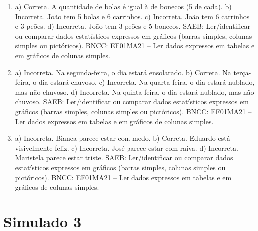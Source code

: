 \begin{enumerate}
\item
a) Correta. A quantidade de bolas é igual à de bonecos (5 de cada).
b) Incorreta. João tem 5 bolas e 6 carrinhos.
c) Incorreta. João tem 6 carrinhos e 3 peões.
d) Incorreta. João tem 3 peões e 5 bonecos.
SAEB: Ler/identificar ou comparar dados estatísticos expressos
em gráficos (barras simples, colunas simples ou pictóricos).
BNCC: EF01MA21 -- Ler dados expressos em tabelas e em gráficos de colunas
simples.

\item
a) Incorreta. Na segunda-feira, o dia estará ensolarado.
b) Correta. Na terça-feira, o dia estará chuvoso.
c) Incorreta. Na quarta-feira, o dia estará nublado, mas não chuvoso.
d) Incorreta. Na quinta-feira, o dia estará nublado, mas não chuvoso.
SAEB: Ler/identificar ou comparar dados estatísticos expressos
em gráficos (barras simples, colunas simples ou pictóricos).
BNCC: EF01MA21  -- Ler dados expressos em tabelas e em gráficos de colunas
simples.

\item
a) Incorreta. Bianca parece estar com medo.
b) Correta. Eduardo está visivelmente feliz.
c) Incorreta. José parece estar com raiva.
d) Incorreta. Maristela parece estar triste.
SAEB: Ler/identificar ou comparar dados estatísticos expressos
em gráficos (barras simples, colunas simples ou pictóricos).
BNCC: EF01MA21 -- Ler dados expressos em tabelas e em gráficos de colunas
simples.
\end{enumerate}

\section*{Simulado 3}

